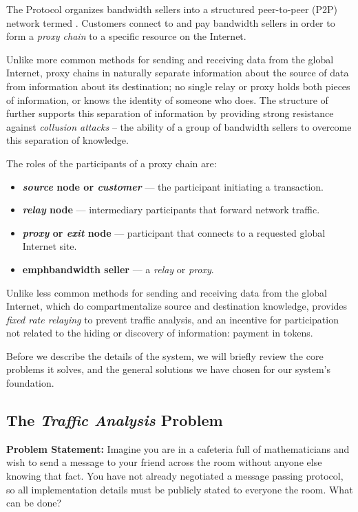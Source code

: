 The \Orchid{} Protocol organizes bandwidth sellers into a %
structured peer-to-peer (P2P) network termed \tOM{}. Customers connect to
\tOM{} and pay bandwidth sellers in order to form a \emph{proxy chain} to a
specific resource on the Internet. 

Unlike more common methods for sending and receiving data from the
global Internet, proxy chains in \tOM{} naturally separate information
about the source of data from information about its destination; no
single relay or proxy holds both pieces of information, or knows the
identity of someone who does. The structure of \tOM{} further
supports this separation of information by providing strong resistance
against \emph{collusion attacks} -- the ability of a group of
bandwidth sellers to overcome this separation of knowledge.

 The roles of the participants of a proxy chain are:
\begin{itemize}
\item \textbf{\emph{source} node or \emph{customer}} --- the participant initiating a transaction.
\item \textbf{\emph{relay} node} --- intermediary participants that forward network traffic.
\item \textbf{\emph{proxy} or \emph{exit} node} --- participant that connects to a requested global Internet site.
\item \textbf{emph{bandwidth seller}} --- a \emph{relay} or \emph{proxy}.
\end{itemize}

Unlike less common methods for sending and receiving data from the
global Internet, which do compartmentalize source and destination
knowledge, \tOM{} provides \emph{fixed rate relaying} to prevent
traffic analysis, and an incentive for participation not related to
the hiding or discovery of information: payment in tokens.

Before we describe the details of the system, we will briefly review
the core problems it solves, and the general solutions we have chosen
for our system's foundation.

\subsection*{The \emph{Traffic Analysis} Problem}

\textbf{Problem Statement:} Imagine you are in a cafeteria full of
mathematicians and wish to send a message to your friend across the
room without anyone else knowing that fact. You have not already
negotiated a message passing protocol, so all implementation details
must be publicly stated to everyone the room. What can be done?

